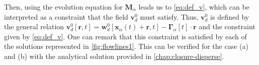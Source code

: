 Then, using the evolution equation for $\textbf{M}_\alpha$ leads us to \ref{eq:def_v}, which can be interpreted as a constraint that the field $\textbf{v}_d^0$ must satisfy. 
Thus, $\textbf{v}_d^0$ is defined by the general relation $\textbf{v}^0_d[\textbf{r},t] =\textbf{w}^{0}_{d}[\textbf{x}_\alpha(t)+\textbf{r},t]  - \bm\Gamma_{\alpha}[t] \cdot \textbf{r}$ and the constraint given by \ref{eq:def_v}. 
One can remark that this constraint is satisfied by each of the solutions represented in \ref{fig:flowlines1}.
This can be verified for the case (a) and (b) with the analytical solution provided in \ref{chap:closure-disperse}. 






